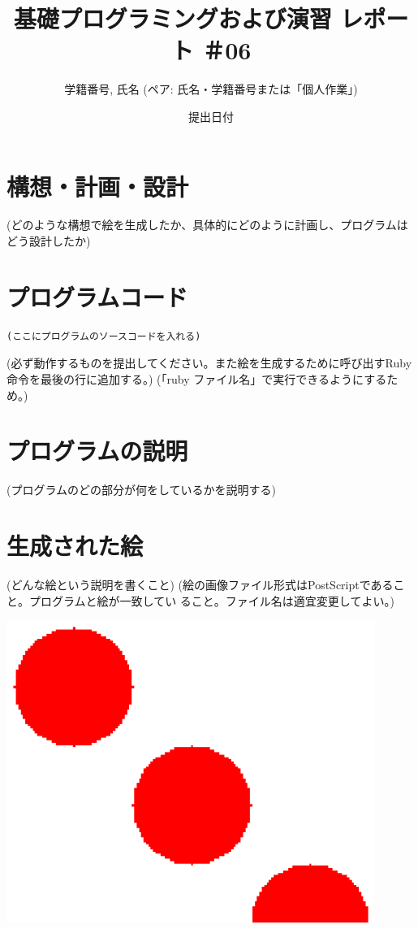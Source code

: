 \documentclass[12pt,a4j]{jarticle}
\begin{document}
\title{基礎プログラミングおよび演習 レポート ＃06}
\author{学籍番号, 氏名 (ペア: 氏名・学籍番号または「個人作業」)}
\date{提出日付}
\maketitle

\section{構想・計画・設計}

(どのような構想で絵を生成したか、具体的にどのように計画し、プログラムはどう設計したか)

\section{プログラムコード}
\begin{verbatim}
(ここにプログラムのソースコードを入れる)
\end{verbatim}
(必ず動作するものを提出してください。また絵を生成するために呼び出すRuby命令を最後の行に追加する。)
(「ruby ファイル名」で実行できるようにするため。)

\section{プログラムの説明}

(プログラムのどの部分が何をしているかを説明する)

\section{生成された絵}

(どんな絵という説明を書くこと)
(絵の画像ファイル形式はPostScriptであること。プログラムと絵が一致してい
ること。ファイル名は適宜変更してよい。)
\begin{center}
\includegraphics[width=12cm]{mypicture.ps}
\end{center}
\end{document}
